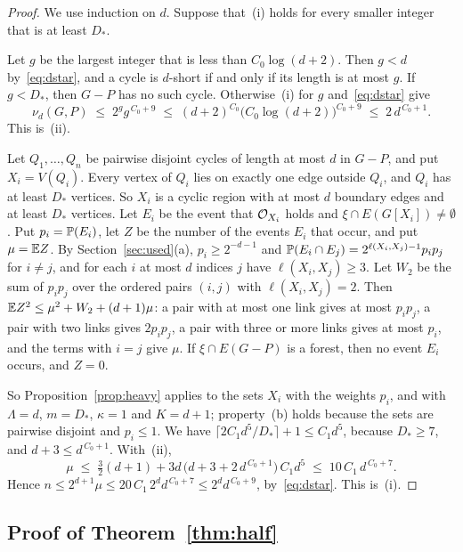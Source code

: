\documentclass[11pt]{article}
\begin{document}
\begin{proof}
We use induction on $d$. Suppose that~(i) holds for every smaller integer that is at least $D_*$.

 Let $g$ be the largest integer that is less than $C_0\log(d+2)$. Then
$g<d$ by~\eqref{eq:dstar}, and a cycle is $d$-short if and only if its length is at most $g$. If
$g<D_*$, then $G-P$ has no such cycle. Otherwise~(i) for $g$ and~\eqref{eq:dstar} give
\[
  \nu_d(G,P)\;\le\;2^{g}g^{\,C_0+9}\;\le\;(d+2)^{C_0}\bigl(C_0\log(d+2)\bigr)^{C_0+9}
  \;\le\;2\,d^{\,C_0+1}.
\]
This is~(ii).

 Let $Q_1,\dots,Q_n$ be pairwise disjoint cycles of
length at most $d$ in $G-P$, and put $X_i=V(Q_i)$. Every vertex of $Q_i$ lies on exactly one edge
outside $Q_i$, and $Q_i$ has at least $D_*$ vertices. So $X_i$ is a cyclic region with at most
$d$ boundary edges and at least $D_*$ vertices. Let $E_i$ be the event that $\mathcal{O}_{X_i}$ holds and
$\xi\cap E(G[X_i])\ne\emptyset$. Put $p_i=\mathbb{P}(E_i)$, let $Z$ be the number of the events $E_i$
that occur, and put $\mu=\mathbb{E} Z$. By Section~\ref{sec:used}(a), $p_i\ge2^{-d-1}$ and
$\mathbb{P}(E_i\cap E_j)=2^{\ell(X_i,X_j)-1}p_ip_j$ for $i\ne j$, and for each $i$ at most $d$ indices
$j$ have $\ell(X_i,X_j)\ge3$. Let $W_2$ be the sum of $p_ip_j$ over the ordered pairs $(i,j)$ with
$\ell(X_i,X_j)=2$. Then $\mathbb{E} Z^{2}\le\mu^{2}+W_2+(d+1)\mu$: a pair with at most one link gives at
most $p_ip_j$, a pair with two links gives $2p_ip_j$, a pair with three or more links gives at
most $p_i$, and the terms with $i=j$ give $\mu$. If $\xi\cap E(G-P)$ is a forest, then no event
$E_i$ occurs, and $Z=0$.

So Proposition~\ref{prop:heavy} applies to the sets $X_i$ with the weights $p_i$, and with
$\Lambda=d$, $m=D_*$, $\kappa=1$ and $K=d+1$; property~(b) holds because the sets are pairwise
disjoint and $p_i\le1$. We have $\lceil2C_1d^{5}/D_*\rceil+1\le C_1d^{5}$, because $D_*\ge7$, and
$d+3\le d^{\,C_0+1}$. With~(ii),
\[
  \mu\;\le\;\tfrac32(d+1)+3d\,\bigl(d+3+2\,d^{\,C_0+1}\bigr)\,C_1d^{5}\;\le\;10\,C_1\,d^{\,C_0+7}.
\]
Hence $n\le2^{d+1}\mu\le20\,C_1\,2^{d}d^{\,C_0+7}\le2^{d}d^{\,C_0+9}$, by~\eqref{eq:dstar}. This
is~(i).
\end{proof}

\subsection{Proof of Theorem~\ref{thm:half}}\label{sec:firstproof}
\end{document}
